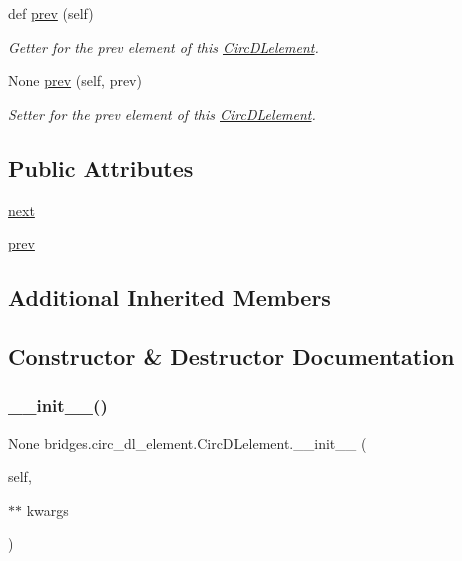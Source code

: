 \begin{DoxyCompactItemize}
$$def \mbox{\hyperlink{classbridges_1_1circ__dl__element_1_1_circ_d_lelement_aa2ebe17f407680a6a4fc886ef9516d61}{prev}} (self)
\begin{DoxyCompactList}\small\item\em Getter for the prev element of this \mbox{\hyperlink{classbridges_1_1circ__dl__element_1_1_circ_d_lelement}{Circ\+D\+Lelement}}. \end{DoxyCompactList}\item 
None \mbox{\hyperlink{classbridges_1_1circ__dl__element_1_1_circ_d_lelement_a0c61c5aefd9fb24c320e9f879d5a2e10}{prev}} (self, prev)
\begin{DoxyCompactList}\small\item\em Setter for the prev element of this \mbox{\hyperlink{classbridges_1_1circ__dl__element_1_1_circ_d_lelement}{Circ\+D\+Lelement}}. \end{DoxyCompactList}\end{DoxyCompactItemize}
\subsection*{Public Attributes}
\begin{DoxyCompactItemize}
\item 
\mbox{\hyperlink{classbridges_1_1circ__dl__element_1_1_circ_d_lelement_a0f01f7ff433628bac241d7c069a476fa}{next}}
\item 
\mbox{\hyperlink{classbridges_1_1circ__dl__element_1_1_circ_d_lelement_a78ed845303a07e303bcbb39f015843d0}{prev}}
\end{DoxyCompactItemize}
\subsection*{Additional Inherited Members}


\subsection{Constructor \& Destructor Documentation}
\mbox{\label{classbridges_1_1circ__dl__element_1_1_circ_d_lelement_a6db1440877da650713f41a3450377d49}} 
\subsubsection{\texorpdfstring{\_\_init\_\_()}{\_\_init\_\_()}}
{\footnotesize\ttfamily  None bridges.\+circ\+\_\+dl\+\_\+element.\+Circ\+D\+Lelement.\+\_\+\+\_\+init\+\_\+\+\_\+ (\begin{DoxyParamCaption}\item[{}]{self,  }\item[{$\ast$$\ast$}]{kwargs }\end{DoxyParamCaption})}



